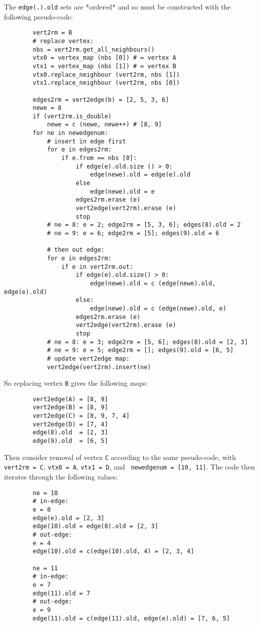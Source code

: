     The {\tt edge(.).old} sets are *ordered* and so must be constructed with the following pseudo-code:
    \begin{lstlisting}
        vert2rm = B
        # replace vertex:
        nbs = vert2rm.get_all_neighbours()
        vtx0 = vertex_map (nbs [0]) # = vertex A
        vtx1 = vertex_map (nbs [1]) # = vertex B
        vtx0.replace_neighbour (vert2rm, nbs [1])
        vtx1.replace_neighbour (vert2rm, nbs [0])

        edges2rm = vert2edge(b) = [2, 5, 3, 6]
        newe = 8
        if (vert2rm.is_double)
            newe = c (newe, newe++) # [8, 9]
        for ne in newedgenum:
            # insert in edge first
            for e in edges2rm:
                if e.from == nbs [0]:
                    if edge(e).old.size () > 0:
                        edge(newe).old = edge(e).old
                    else
                        edge(newe).old = e
                    edges2rm.erase (e)
                    vert2edge(vert2rm).erase (e)
                    stop
            # ne = 8: e = 2; edge2rm = [5, 3, 6]; edges(8).old = 2
            # ne = 9: e = 6; edge2rm = [5]; edges(9).old = 6

            # then out edge:
            for e in edges2rm:
                if e in vert2rm.out:
                    if edge(e).old.size() > 0:
                        edge(newe).old = c (edge(newe).old, edge(e).old)
                    else:
                        edge(newe).old = c (edge(newe).old, e)
                    edges2rm.erase (e)
                    vert2edge(vert2rm).erase (e)
                    stop
            # ne = 8: e = 3; edge2rm = [5, 6]; edges(8).old = [2, 3]
            # ne = 9: e = 5; edge2rm = []; edges(9).old = [6, 5]
            # update vert2edge map:
            vert2edge(vert2rm).insert(ne)
    \end{lstlisting}
    So replacing vertex {\tt B} gives the following maps:
    \begin{lstlisting}
        vert2edge(A) = [8, 9]
        vert2edge(B) = [8, 9]
        vert2edge(C) = [8, 9, 7, 4]
        vert2edge(D) = [7, 4]
        edge(8).old  = [2, 3]
        edge(9).old  = [6, 5]
    \end{lstlisting}
    Then consider removal of vertex {\tt C} according to the same pseudo-code, with {\tt vert2rm = C}, {\tt vtx0 = A}, {\tt vtx1 = D}, and {\tt
    newedgenum = [10, 11]}. The code then iterates through the following values:
    \begin{lstlisting}
        ne = 10
        # in-edge:
        e = 8
        edge(e).old = [2, 3]
        edge(10).old = edge(8).old = [2, 3]
        # out-edge:
        e = 4
        edge(10).old = c(edge(10).old, 4) = [2, 3, 4]

        ne = 11
        # in-edge:
        e = 7
        edge(11).old = 7
        # out-edge:
        e = 9
        edge(11).old = c(edge(11).old, edge(e).old) = [7, 6, 5]
    \end{lstlisting}
